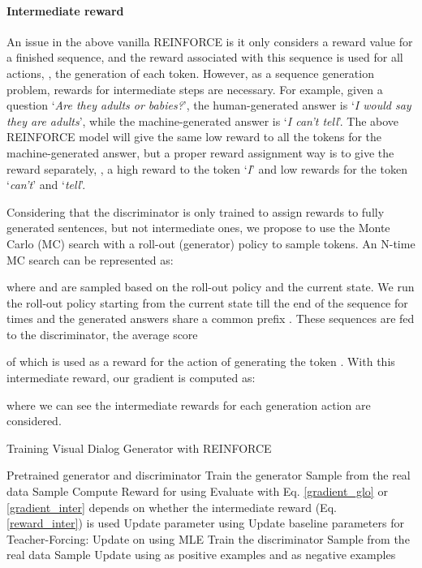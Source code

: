 \documentclass[10pt,twocolumn,letterpaper]{article}
\begin{document}
\paragraph{Intermediate reward}
An issue in the above vanilla REINFORCE is it only considers a reward value for a finished sequence, and the reward associated with this sequence is used for all actions, \ie, the generation of each token. However, as a sequence generation problem, rewards for intermediate steps are necessary. For example, given a question `\textit{Are they adults or babies?}', the human-generated answer is `\textit{I would say they are adults}', while the machine-generated answer is `\textit{I can't tell}'. The above REINFORCE model will give the same low reward to all the tokens for the machine-generated answer, but a proper reward assignment way is to give the reward separately, \ie, a high reward to the token `\textit{I}' and low rewards for the token `\textit{can't}' and `\textit{tell}'.

Considering that the discriminator is only trained to assign rewards to fully generated sentences, but not intermediate ones, we propose to use the Monte Carlo (MC) search with a roll-out (generator) policy  to sample tokens. An N-time MC search can be represented as:

where  and  are sampled based on the roll-out policy  and the current state. We run the roll-out policy starting from the current state till the end of the sequence for  times and the  generated answers share a common prefix . These  sequences are fed to the discriminator, the average score 

of which is used as a reward for the action of generating the token . With this intermediate reward, our gradient is computed as:

where we can see the intermediate rewards for each generation action are considered.

\begin{algorithm}[t]
\footnotesize
 \caption{Training Visual Dialog Generator with REINFORCE}
 \begin{algorithmic}[1]
  \REQUIRE Pretrained generator  and discriminator 
  \STATE  Train the generator 
  \STATE Sample  from the real data
  \STATE Sample  
  \STATE Compute Reward  for  using 
  \STATE Evaluate  with Eq. \ref{gradient_glo} or \ref{gradient_inter} depends on whether the intermediate reward (Eq. \ref{reward_inter}) is used
  \STATE Update  parameter  using 
  \STATE Update baseline parameters for 
  \STATE Teacher-Forcing: Update  on  using MLE
  \ENDFOR
\STATE  Train the discriminator 
  \STATE Sample  from the real data
  \STATE Sample 
  \STATE Update  using  as positive examples and  as negative examples
  \ENDFOR
 \end{algorithmic}
 \label{alg}
\end{algorithm}
\end{document}
